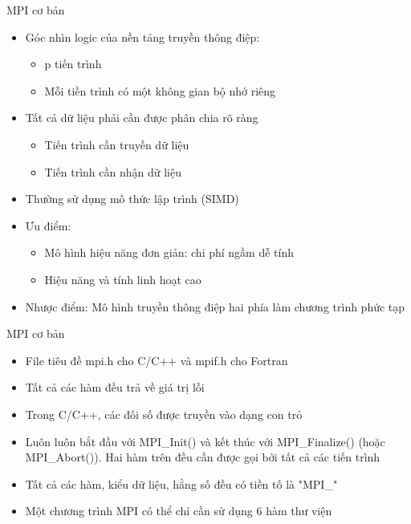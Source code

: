 \documentclass[10pt]{beamer}
\theoremstyle{remark}
\numberwithin{algocf}{section}
\numberwithin{equation}{section}
\numberwithin{dl}{section}
\numberwithin{figure}{section}
\begin{document}
\begin{frame}{MPI cơ bản}
    \begin{itemize}
        \item Góc nhìn logic của nền tảng truyền thông điệp:
        \begin{itemize}
            \item p tiến trình
            \item Mỗi tiền trình có một không gian bộ nhớ riêng
        \end{itemize}
        \item Tất cả dữ liệu phải cần được phân chia rõ ràng
        \begin{itemize}
            \item Tiến trình cần truyền dữ liệu
            \item Tiến trình cần nhận dữ liệu
        \end{itemize}
        \item Thường sử dụng mô thức lập trình (SIMD)
        \item Ưu điểm:
        \begin{itemize}
            \item Mô hình hiệu năng đơn giản: chi phí ngầm dễ tính
            \item Hiệu năng và tính linh hoạt cao
        \end{itemize}
        \item Nhược điểm: Mô hình truyền thông điệp hai phía làm chương trình phức tạp
    \end{itemize}
\end{frame}

\begin{frame}{MPI cơ bản}
    \begin{itemize}
        \item File tiêu đề mpi.h cho C/C++ và mpif.h cho Fortran
        \item Tất cả các hàm đều trả về giá trị lỗi
        \item Trong C/C++, các đối số được truyền vào dạng con trỏ
        \item Luôn luôn bắt đầu với MPI\_Init() và kết thúc với MPI\_Finalize() (hoặc MPI\_Abort()).
        Hai hàm trên đều cần được gọi bởi tất cả các tiến trình
        \item Tất cả các hàm, kiểu dữ liệu, hằng số đều có tiền tố là "MPI\_"
        \item Một chương trình MPI có thể chỉ cần sử dụng 6 hàm thư viện
    \end{itemize}
\end{frame}
\end{document}
